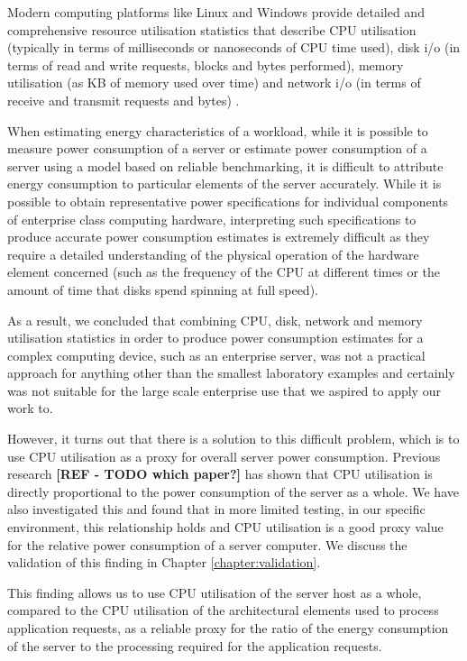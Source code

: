 Modern computing platforms like Linux and Windows provide detailed and comprehensive resource utilisation statistics that describe CPU utilisation (typically in terms of milliseconds or nanoseconds of CPU time used), disk i/o (in terms of read and write requests, blocks and bytes performed), memory utilisation (as KB of memory used over time) and network i/o (in terms of receive and transmit requests and bytes) \cite{unix_sar_command, windows_performance_monitor}.

When estimating energy characteristics of a workload, while it is possible to measure power consumption of a server or estimate power consumption of a server using a model based on reliable benchmarking, it is difficult to attribute energy consumption to particular elements of the server accurately.  While it is possible to obtain representative power specifications \cite{hitachi_drive_data_sheet} for individual components of enterprise class computing hardware, interpreting such specifications to produce accurate power consumption estimates is extremely difficult as they require a detailed understanding of the physical operation of the hardware element concerned (such as the frequency of the CPU at different times or the amount of time that disks spend spinning at full speed).

As a result, we concluded that combining CPU, disk, network and memory utilisation statistics in order to produce power consumption estimates for a complex computing device, such as an enterprise server, was not a practical approach for anything other than the smallest laboratory examples and certainly was not suitable for the large scale enterprise use that we aspired to apply our work to.

However, it turns out that there is a solution to this difficult problem, which is to use CPU utilisation as a proxy for overall server power consumption.  Previous research \textbf{[REF - TODO which paper?]} has shown that CPU utilisation is directly proportional to the power consumption of the server as a whole.  We have also investigated this and found that in more limited testing, in our specific environment, this relationship holds and CPU utilisation is a good proxy value for the relative power consumption of a server computer.  We discuss the validation of this finding in Chapter \ref{chapter:validation}.

This finding allows us to use CPU utilisation of the server host as a whole, compared to the CPU utilisation of the architectural elements used to process application requests, as a reliable proxy for the ratio of the energy consumption of the server to the processing required for the application requests.

